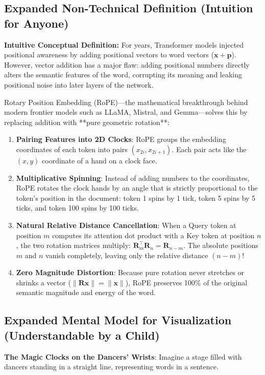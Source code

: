 \documentclass[11pt,a4paper]{article}
\theoremstyle{definition}
\begin{document}
\subsection{Expanded Non-Technical Definition (Intuition for Anyone)}
\textbf{Intuitive Conceptual Definition:}
For years, Transformer models injected positional awareness by adding positional vectors to word vectors ($\mathbf{x} + \mathbf{p}$). However, vector addition has a major flaw: adding positional numbers directly alters the semantic features of the word, corrupting its meaning and leaking positional noise into later layers of the network.

Rotary Position Embedding (RoPE)—the mathematical breakthrough behind modern frontier models such as LLaMA, Mistral, and Gemma—solves this by replacing addition with **pure geometric rotation**:
\begin{enumerate}
    \item \textbf{Pairing Features into 2D Clocks}: RoPE groups the embedding coordinates of each token into pairs $(x_{2i}, x_{2i+1})$. Each pair acts like the $(x, y)$ coordinate of a hand on a clock face.
    \item \textbf{Multiplicative Spinning}: Instead of adding numbers to the coordinates, RoPE rotates the clock hands by an angle that is strictly proportional to the token's position in the document: token 1 spins by 1 tick, token 5 spins by 5 ticks, and token 100 spins by 100 ticks.
    \item \textbf{Natural Relative Distance Cancellation}: When a Query token at position $m$ computes its attention dot product with a Key token at position $n$, the two rotation matrices multiply: $\mathbf{R}_m^\top \mathbf{R}_n = \mathbf{R}_{n-m}$. The absolute positions $m$ and $n$ vanish completely, leaving only the relative distance $(n - m)$!
    \item \textbf{Zero Magnitude Distortion}: Because pure rotation never stretches or shrinks a vector ($\|\mathbf{R}\mathbf{x}\| = \|\mathbf{x}\|$), RoPE preserves 100\% of the original semantic magnitude and energy of the word.
\end{enumerate}

\subsection{Expanded Mental Model for Visualization (Understandable by a Child)}
\textbf{The Magic Clocks on the Dancers' Wrists}:
Imagine a stage filled with dancers standing in a straight line, representing words in a sentence.
\end{document}
